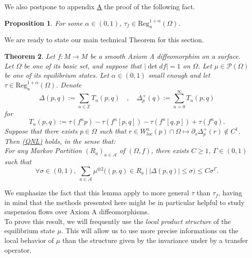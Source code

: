 \documentclass[a4paper]{article}
\newtheorem{theorem}{Theorem}[section]
\newtheorem{proposition}[theorem]{Proposition}
\theoremstyle{definition}
\begin{document}
We also postpone to appendix \hyperref[ap:A]{A} the proof of the following fact.

\begin{proposition}\label{prop:REGu}
For some $\alpha \in (0,1)$, $\tau_f \in \text{Reg}_u^{1+\alpha}(\Omega)$.
\end{proposition}

We are ready to state our main technical Theorem for this section.

\begin{theorem}\label{th:QNL}
Let $f :M \rightarrow M$ be a smooth Axiom A diffeomorphim on a surface. Let $\Omega$ be one of its basic set, and suppose that $|\det df|=1$ on $\Omega$. Let $\mu \in \mathcal{P}(\Omega)$ be one of its equilibrium states. Let $\alpha \in (0,1)$ small enough and let $\tau \in \text{Reg}_u^{1+\alpha}(\Omega)$. Denote $$\Delta(p,q) := \sum_{n \in \mathbb{Z}} T_n(p,q) \quad , \quad \Delta^+_p(q) := \sum_{n=0}^\infty T_n(p,q)$$
for $$T_n(p,q) := \tau(f^n p) - \tau(f^n [p,q]) - \tau(f^n[q,p]) + \tau(f^n q).$$ Suppose that there exists $p \in \Omega$ such that $r \in W^u_{loc}(p) \cap \Omega \mapsto \partial_s \Delta^+_p(r) \notin C^1$. Then \hyperref[QNL]{(QNL)} holds, in the sense that: \\

For any Markov Partition $(R_a)_{a \in \mathcal{A}}$ of $(\Omega,f)$, there exists $C \geq 1$, $\Gamma \in (0,1)$ such that
$$\forall \sigma \in (0,1), \ \sum_{a \in \mathcal{A}} \mu^{\otimes 2}\Big( (p,q) \in R_a \ \Big| \ |\Delta(p,q)| \leq \sigma \Big) \leq C \sigma^\Gamma .$$
\end{theorem}

We emphasize the fact that this lemma apply to more general $\tau$ than $\tau_f$, having in mind that the methods presented here might be in particular helpful to study suspension flows over Axiom A diffeomorphisms. \\
To prove this result, we will frequently use the \emph{local product structure} of the equilibrium state $\mu$. This will allow us to use more precise informations on the local behavior of $\mu$ than the structure given by the invariance under by a transfer operator. 
\end{document}
